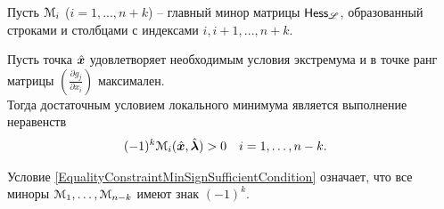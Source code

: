 Пусть ${\mathcal M}_{i}$ ($i=1,...,n+k$) -- главный минор матрицы $\mathsf{Hess}_{\mathscr L}$, 
образованный строками и столбцами с индексами $i,i+1,...,n+k$.

\begin{teorema}\label{EqualityConstraintMinSufficientCondition}
Пусть точка $\hat{{\bm x}}$ удовлетворяет необходимым условия экстремума и в точке 
ранг матрицы $(\frac{\partial g_j}{\partial x_i})$ максимален.\\
Тогда достаточным условием локального минимума является выполнение неравенств
\begin{align}\label{EqualityConstraintMinSignSufficientCondition}
	(-1)^k{\mathcal M}_i(\hat{{\bm x}},\hat{{\bm{ \lambda}}})&>0 & 
	i&=1,\ldots,n-k.
\end{align}
\end{teorema}
\begin{remark}
Условие \eqref{EqualityConstraintMinSignSufficientCondition} означает, что
все миноры ${\mathcal M}_1,\ldots,{\mathcal M}_{n-k}$ имеют знак $(-1)^k$.
\end{remark}

